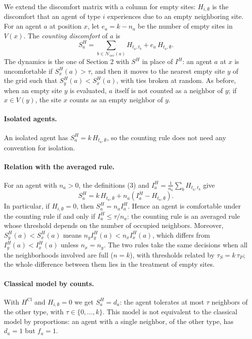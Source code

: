 \documentclass{article}
\theoremstyle{remark}
\begin{document}
We extend the discomfort matrix with a column for empty sites: $H_{i,\emptyset}$ is the discomfort that an agent of type $i$ experiences due to an empty neighboring site. For an agent $a$ at position $x$, let $e_a=k-n_a$ be the number of empty sites in $V(x)$. The \emph{counting discomfort} of $a$ is
\[
S_a^H=\sum_{b\in\mathcal{N}_{\mathrm{occ}}(a)} H_{t_a,t_b}+e_a\,H_{t_a,\emptyset}. \tag{3}
\]
The dynamics is the one of Section 2 with $S^H$ in place of $I^H$: an agent $a$ at $x$ is uncomfortable if $S_x^H(a)>\tau$, and then it moves to the nearest empty site $y$ of the grid such that $S_y^H(a)<S_x^H(a)$, with ties broken at random. As before, when an empty site $y$ is evaluated, $a$ itself is not counted as a neighbor of $y$; if $x\in V(y)$, the site $x$ counts as an empty neighbor of $y$.

\paragraph{Isolated agents.} An isolated agent has $S_a^H=k\,H_{t_a,\emptyset}$, so the counting rule does not need any convention for isolation.

\paragraph{Relation with the averaged rule.} For an agent with $n_a>0$, the definitions (3) and $I_a^H=\frac{1}{n_a}\sum_{b}H_{t_a,t_b}$ give
\[
S_a^H=k\,H_{t_a,\emptyset}+n_a\left(I_a^H-H_{t_a,\emptyset}\right). \tag{4}
\]
In particular, if $H_{i,\emptyset}=0$, then $S_a^H=n_a I_a^H$. Hence an agent is comfortable under the counting rule if and only if $I_a^H\le\tau/n_a$: the counting rule is an averaged rule whose threshold depends on the number of occupied neighbors. Moreover, $S_y^H(a)<S_x^H(a)$ means $n_y I_y^H(a)<n_x I_x^H(a)$, which differs from $I_y^H(a)<I_x^H(a)$ unless $n_x=n_y$. The two rules take the same decisions when all the neighborhoods involved are full ($n=k$), with thresholds related by $\tau_S=k\,\tau_P$; the whole difference between them lies in the treatment of empty sites.

\paragraph{Classical model by counts.} With $H^{\mathrm{Cl}}$ and $H_{i,\emptyset}=0$ we get $S_a^H=d_a$: the agent tolerates at most $\tau$ neighbors of the other type, with $\tau\in\{0,\dots,k\}$. This model is not equivalent to the classical model by proportions: an agent with a single neighbor, of the other type, has $d_a=1$ but $f_a=1$.
\end{document}
